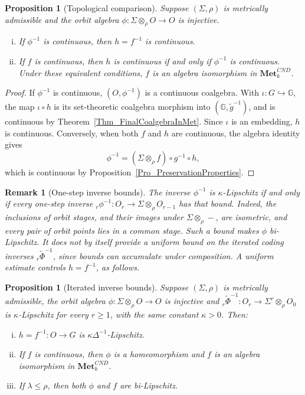 \documentclass{sn-jnl}%
\theoremstyle{thmstyleone}%
\newtheorem{proposition}[theorem]{Proposition}%
\theoremstyle{thmstyletwo}%
\newtheorem{remark}{Remark}%
\theoremstyle{thmstylethree}%
\newcommand{\mcnd}{\mathbf{Met}_{k}^{CND}}
\newcommand{\M}{\Sigma}
\newcommand{\Fw}{\M\otimes_{\w}}
\newcommand{\Fwi}[1]{\M^{#1}\otimes_{\w}}
\newcommand{\G}{\mathbb{G}}
\newcommand{\g}{\tilde{g}^{-1}}
\newcommand{\f}{\phi}
\newcommand{\tf}{\tilde{\Phi}}
\newcommand{\w}{\rho}
\begin{document}
\begin{proposition}[Topological comparison]
\label{pro_Iso_G_O_metricSetting}
    Suppose $(\Sigma,\rho)$ is metrically admissible and the orbit algebra $\f:\Fw O\to O$ is injective.
    \begin{enumerate}[(i)]
        \item If $\f^{-1}$ is continuous, then $h=f^{-1}$ is continuous.
        \item If $f$ is continuous, then $h$ is continuous if and only if $\f^{-1}$ is continuous. Under these equivalent conditions, $f$ is an algebra isomorphism in $\mcnd$.
    \end{enumerate}
\end{proposition}

\begin{proof}
If $\f^{-1}$ is continuous, $(O,\f^{-1})$ is a continuous coalgebra. With $\iota:G\hookrightarrow\G$, the map $\iota\circ h$ is its set-theoretic coalgebra morphism into $(\G,\g)$, and is continuous by Theorem~\ref{Thm_FinalCoalgebraInMet}. Since $\iota$ is an embedding, $h$ is continuous. Conversely, when both $f$ and $h$ are continuous, the algebra identity gives
\begin{equation} 
\nonumber
    \f^{-1}=(\Fw f)\circ g^{-1}\circ h,
\end{equation}
which is continuous by Proposition~\ref{Pro_PreservationProperties}.
\end{proof}

\begin{remark}[One-step inverse bounds]
\label{prop_Lipofphi_inverse}
The inverse $\f^{-1}$ is $\kappa$-Lipschitz if and only if every one-step inverse ${}_r\f^{-1}:O_r\to\Fw O_{r-1}$ has that bound. Indeed, the inclusions of orbit stages, and their images under $\Fw-$, are isometric, and every pair of orbit points lies in a common stage. Such a bound makes $\f$ bi-Lipschitz. It does not by itself provide a uniform bound on the \emph{iterated} coding inverses ${}_r\tf^{-1}$, since bounds can accumulate under composition. A uniform estimate controls $h=f^{-1}$, as follows.
\end{remark}

\begin{proposition}[Iterated inverse bounds]
\label{prop_Lipof_tphi_inverse}
    Suppose $(\Sigma,\rho)$ is metrically admissible, the orbit algebra $\f:\Fw O\to O$ is injective and ${}_r\tf^{-1}:O_r\to\Fwi{r}O_0$ is $\kappa$-Lipschitz for every $r\geq1$, with the same constant $\kappa>0$. Then:
    \begin{enumerate}[(i)]
        \item $h=f^{-1}:O\to G$ is $\kappa\Delta^{-1}$-Lipschitz.
        \item If $f$ is continuous, then $\f$ is a homeomorphism and $f$ is
            an algebra isomorphism in $\mcnd$.
        \item If $\lambda\leq\rho$, then both $\f$ and $f$ are bi-Lipschitz.
    \end{enumerate}
\end{proposition}
\end{document}
